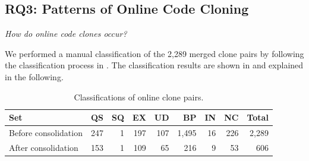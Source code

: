 \documentclass[10pt,journal,compsoc]{IEEEtran}
\begin{document}
\subsection{RQ3: Patterns of Online Code Cloning}
\vspace{0.25cm}
\textit{How do online code clones occur?}
\vspace{0.25cm}

We performed a manual classification
of the 2,289 merged clone pairs by following the classification process
in . 
The classification results are shown in  
and explained in the following.

\begin{table}
	\centering
	\caption{Classifications of online clone pairs.}
	\label{tab:classification_good_o}
	\begin{tabular}{lrrrrrrrr}
		\toprule
		Set & QS & SQ & EX & UD & BP & IN & NC & Total \\ 
		\midrule
		Before consolidation & 247 & 1 & 197 & 107 & 1,495 & 16 & 226 & 2,289 \\
		After consolidation & 153 & 1 & 109 & 65 & 216 & 9 & 53 & 606 \\
		\bottomrule
	\end{tabular} 
\end{table}

\end{document}
